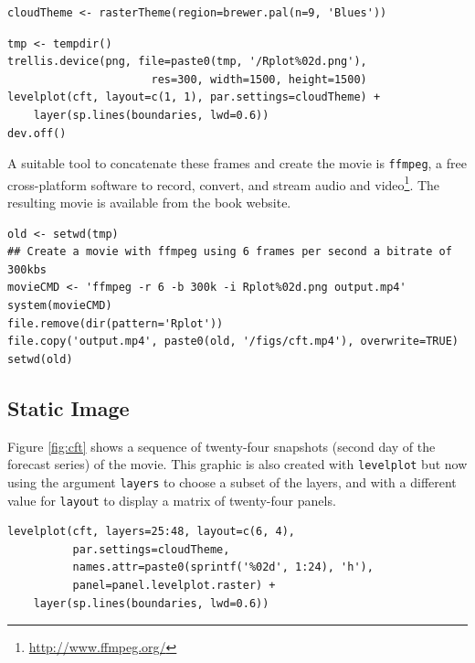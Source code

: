 \documentclass[smallroyalvopaper]{memoir}
\begin{document}
\lstset{language=R,numbers=none}
\begin{lstlisting}
cloudTheme <- rasterTheme(region=brewer.pal(n=9, 'Blues'))
\end{lstlisting}


\lstset{language=R,numbers=none}
\begin{lstlisting}
tmp <- tempdir()
trellis.device(png, file=paste0(tmp, '/Rplot%02d.png'),
                      res=300, width=1500, height=1500)
levelplot(cft, layout=c(1, 1), par.settings=cloudTheme) +
    layer(sp.lines(boundaries, lwd=0.6))
dev.off()
\end{lstlisting}

A suitable tool to concatenate these frames and create the movie is
\texttt{ffmpeg}, a free cross-platform software to record, convert, and stream
audio and video\footnote{\url{http://www.ffmpeg.org/}}. The resulting movie is available from the book
website.


\lstset{language=R,numbers=none}
\begin{lstlisting}
old <- setwd(tmp)
## Create a movie with ffmpeg using 6 frames per second a bitrate of 300kbs
movieCMD <- 'ffmpeg -r 6 -b 300k -i Rplot%02d.png output.mp4'
system(movieCMD)
file.remove(dir(pattern='Rplot'))
file.copy('output.mp4', paste0(old, '/figs/cft.mp4'), overwrite=TRUE)
setwd(old)
\end{lstlisting}
\subsection{Static Image}
\label{sec-5-4}
Figure \ref{fig:cft} shows a sequence of twenty-four snapshots (second day
of the forecast series) of the movie. This graphic is also created
with \texttt{levelplot} but now using the argument \texttt{layers} to choose a
subset of the layers, and with a different value for \texttt{layout} to
display a matrix of twenty-four panels.
\lstset{language=R,numbers=none}
\begin{lstlisting}
levelplot(cft, layers=25:48, layout=c(6, 4),
          par.settings=cloudTheme,
          names.attr=paste0(sprintf('%02d', 1:24), 'h'),
          panel=panel.levelplot.raster) +
    layer(sp.lines(boundaries, lwd=0.6))
\end{lstlisting}
\end{document}
